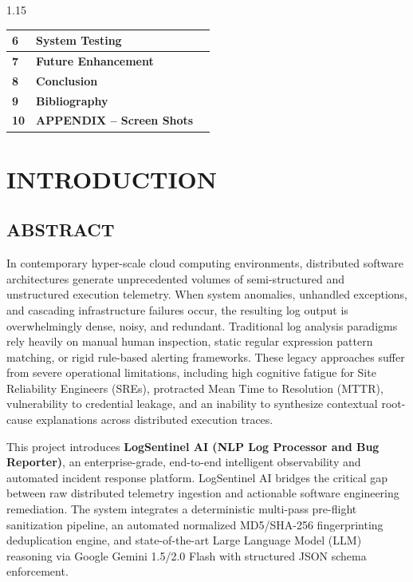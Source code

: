 \documentclass[12pt,a4paper]{article}
\begin{document}
\begin{spacing}{1.15}
\begin{center}
\begin{tabular}{|>{\centering\arraybackslash}p{1.4cm}|>{\raggedright\arraybackslash}p{11.2cm}|>{\centering\arraybackslash}p{2.0cm}|}
\hline
\textbf{6} & \textbf{System Testing} & \pageref{sec:system_testing} \\
\hline
\textbf{7} & \textbf{Future Enhancement} & \pageref{sec:future_enhancement} \\
\hline
\textbf{8} & \textbf{Conclusion} & \pageref{sec:conclusion} \\
\hline
\textbf{9} & \textbf{Bibliography} & \pageref{sec:bibliography} \\
\hline
\textbf{10} & \textbf{APPENDIX -- Screen Shots} & \pageref{sec:appendix} \\
\hline
\end{tabular}
\end{center}
\end{spacing}
\clearpage

\setcounter{page}{1}

\section{INTRODUCTION}\label{sec:intro}

\subsection{ABSTRACT}\label{sec:abstract}
In contemporary hyper-scale cloud computing environments, distributed software architectures generate unprecedented volumes of semi-structured and unstructured execution telemetry. When system anomalies, unhandled exceptions, and cascading infrastructure failures occur, the resulting log output is overwhelmingly dense, noisy, and redundant. Traditional log analysis paradigms rely heavily on manual human inspection, static regular expression pattern matching, or rigid rule-based alerting frameworks. These legacy approaches suffer from severe operational limitations, including high cognitive fatigue for Site Reliability Engineers (SREs), protracted Mean Time to Resolution (MTTR), vulnerability to credential leakage, and an inability to synthesize contextual root-cause explanations across distributed execution traces.

This project introduces \textbf{LogSentinel AI (NLP Log Processor and Bug Reporter)}, an enterprise-grade, end-to-end intelligent observability and automated incident response platform. LogSentinel AI bridges the critical gap between raw distributed telemetry ingestion and actionable software engineering remediation. The system integrates a deterministic multi-pass pre-flight sanitization pipeline, an automated normalized MD5/SHA-256 fingerprinting deduplication engine, and state-of-the-art Large Language Model (LLM) reasoning via Google Gemini 1.5/2.0 Flash with structured JSON schema enforcement.
\end{document}
